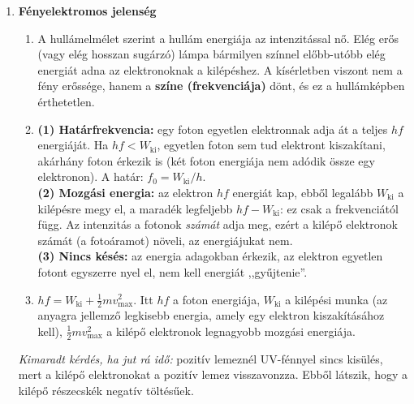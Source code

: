 \documentclass[11pt,a4paper]{article}
\begin{document}
\begin{enumerate}
\item \textbf{Fényelektromos jelenség}
  \begin{enumerate}
    \item A hullámelmélet szerint a hullám energiája az intenzitással nő. Elég erős
      (vagy elég hosszan sugárzó) lámpa bármilyen színnel előbb-utóbb elég energiát adna
      az elektronoknak a kilépéshez. A kísérletben viszont nem a fény erőssége, hanem a
      \textbf{színe (frekvenciája)} dönt, és ez a hullámképben érthetetlen.
    \item \textbf{(1) Határfrekvencia:} egy foton egyetlen elektronnak adja át a teljes
      $hf$ energiáját. Ha $hf < W_\text{ki}$, egyetlen foton sem tud elektront kiszakítani,
      akárhány foton érkezik is (két foton energiája nem adódik össze egy elektronon).
      A határ: $f_0 = W_\text{ki}/h$.\\
      \textbf{(2) Mozgási energia:} az elektron $hf$ energiát kap, ebből legalább
      $W_\text{ki}$ a kilépésre megy el, a maradék legfeljebb $hf - W_\text{ki}$: ez csak
      a frekvenciától függ. Az intenzitás a fotonok \emph{számát} adja meg, ezért a
      kilépő elektronok számát (a fotoáramot) növeli, az energiájukat nem.\\
      \textbf{(3) Nincs késés:} az energia adagokban érkezik, az elektron egyetlen
      fotont egyszerre nyel el, nem kell energiát ,,gyűjtenie''.
    \item $hf = W_\text{ki} + \tfrac12 m v_\text{max}^2$. Itt $hf$ a foton energiája,
      $W_\text{ki}$ a kilépési munka (az anyagra jellemző legkisebb energia, amely egy
      elektron kiszakításához kell), $\tfrac12 m v_\text{max}^2$ a kilépő elektronok
      legnagyobb mozgási energiája.
  \end{enumerate}
  \emph{Kimaradt kérdés, ha jut rá idő:} pozitív lemeznél UV-fénnyel sincs kisülés,
  mert a kilépő elektronokat a pozitív lemez visszavonzza. Ebből látszik, hogy a kilépő
  részecskék negatív töltésűek.


\end{enumerate}
\end{document}
